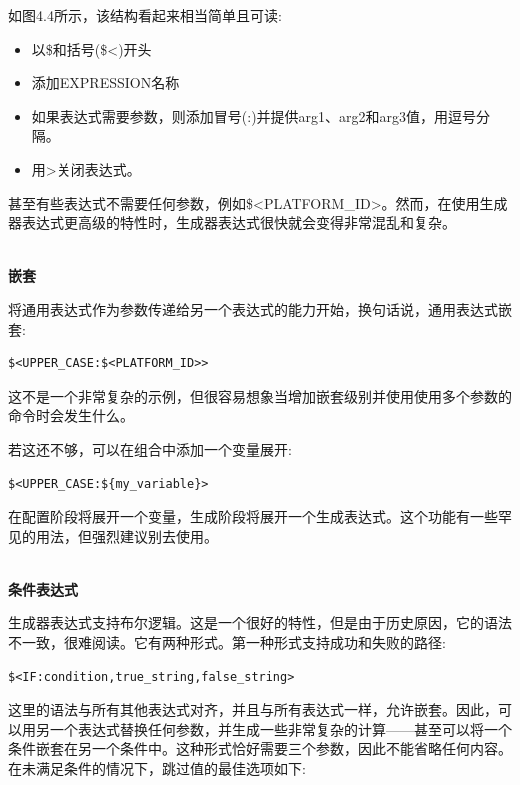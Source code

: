 如图4.4所示，该结构看起来相当简单且可读:

\begin{itemize}
\item 
以\$和括号(\$<)开头

\item 
添加EXPRESSION名称

\item 
如果表达式需要参数，则添加冒号(:)并提供arg1、arg2和arg3值，用逗号分隔。

\item 
用>关闭表达式。
\end{itemize}

甚至有些表达式不需要任何参数，例如\$<PLATFORM\_ID>。然而，在使用生成器表达式更高级的特性时，生成器表达式很快就会变得非常混乱和复杂。

\hspace*{\fill} \\ %
\noindent
\textbf{嵌套}

将通用表达式作为参数传递给另一个表达式的能力开始，换句话说，通用表达式嵌套:

\begin{lstlisting}[style=styleCMake]
$<UPPER_CASE:$<PLATFORM_ID>>
\end{lstlisting}

这不是一个非常复杂的示例，但很容易想象当增加嵌套级别并使用使用多个参数的命令时会发生什么。

若这还不够，可以在组合中添加一个变量展开:

\begin{lstlisting}[style=styleCMake]
$<UPPER_CASE:${my_variable}>
\end{lstlisting}

在配置阶段将展开一个变量，生成阶段将展开一个生成表达式。这个功能有一些罕见的用法，但强烈建议别去使用。

\hspace*{\fill} \\ %
\noindent
\textbf{条件表达式}

生成器表达式支持布尔逻辑。这是一个很好的特性，但是由于历史原因，它的语法不一致，很难阅读。它有两种形式。第一种形式支持成功和失败的路径:

\begin{lstlisting}[style=styleCMake]
$<IF:condition,true_string,false_string>
\end{lstlisting}

这里的语法与所有其他表达式对齐，并且与所有表达式一样，允许嵌套。因此，可以用另一个表达式替换任何参数，并生成一些非常复杂的计算——甚至可以将一个条件嵌套在另一个条件中。这种形式恰好需要三个参数，因此不能省略任何内容。在未满足条件的情况下，跳过值的最佳选项如下:

